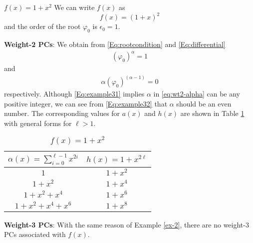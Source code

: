 \begin{example}
	$f(x)=1+x^2$\newline
	We can write $f(x)$ as
	\[
	f(x)=(1+x)^2\]
	and the order of the root $\varphi_0$ is $\epsilon_0=1$.
	
	\textbf{Weight-2 PCs}: We obtain from \eqref{Eq:rootcondition} and \eqref{Eq:differential}
	\begin{align}
		(\varphi_0)^{\alpha} = 1
		\label{Eq:example31}
	\end{align}
	and
	\begin{align}
		\alpha(\varphi_0)^{(\alpha-1)} = 0
		\label{Eq:example32}
	\end{align}	
	respectively. Although \eqref{Eq:example31} implies $\alpha$ in \eqref{eq:wt2-alpha} can be any positive integer, we can see from \eqref{Eq:example32} that $\alpha$  should be an even number.
	The corresponding values for $a(x)$ and $h(x)$ are shown in Table \ref{novelTab1} with general forms for $\ell>1$.
	\begin{table}[htbp]
		\renewcommand{\arraystretch}{1.3}
		\caption{$f(x)=1+x^2$}
		\centering
		\begin{tabular}{c c } 
			\hline
			$\alpha(x)=\sum_{i=0}^{\ell-1} x^{2i}$ & $h(x)=1+x^{2\ell}$ \\ [0.5ex] 
			\hline\hline
			$1$ & $1+x^2$\\ 
			$1+x^2$ & $1+x^4$ \\
			$1+x^2+x^4$ & $1+x^6$\\
			$1+x^2+x^4+x^6$ & $1+x^8$ 
		\end{tabular}
		\label{novelTab1}
	\end{table}
	
	\textbf{Weight-3 PCs}:
	With the same reason of Example \ref{ex-2}, there are no weight-3 PCs associated with $f(x)$.
\label{ex-3}
\end{example}


